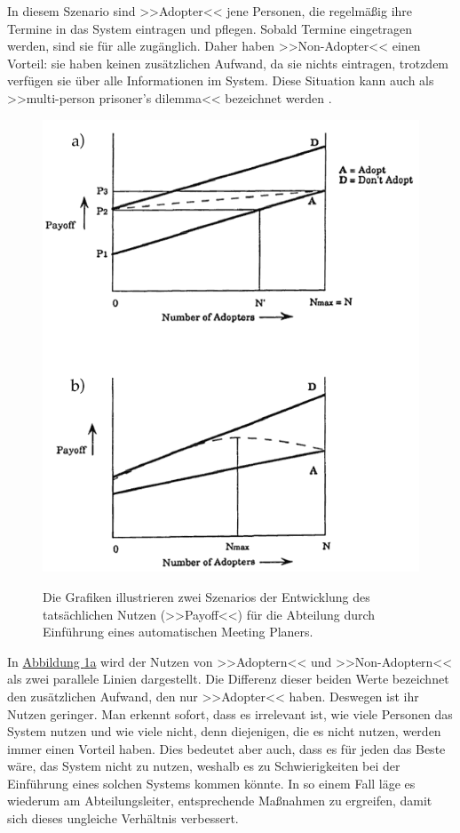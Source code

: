 	In diesem Szenario sind >>Adopter<< jene Personen, die regelmäßig ihre Termine in das System eintragen und pflegen. Sobald Termine eingetragen werden, sind sie für alle zugänglich. Daher haben >>Non-Adopter<< einen Vorteil: sie haben keinen zusätzlichen Aufwand, da sie nichts eintragen, trotzdem verfügen sie über alle Informationen im System. Diese Situation kann auch als >>multi-person prisoner's dilemma<< bezeichnet werden \citep{Schelling:1987}.

\begin{figure}
	{\includegraphics[width=1\linewidth]{gfx/markusMeetingPlanner}}
\caption[>>Payoff<< durch Nutzung eines automatischen Meeting Planers \newline \citep{Markus:1990}]{Die Grafiken illustrieren zwei Szenarios der Entwicklung des tatsächlichen Nutzen (>>Payoff<<) für die Abteilung durch Einführung eines automatischen Meeting Planers.}\label{fig:markusMeeting}
\end{figure}
\clearpage
In \hyperref[fig:markusMeeting]{Abbildung \ref*{fig:markusMeeting}a} wird der Nutzen von >>Adoptern<< und >>Non-Adoptern<< als zwei parallele Linien dargestellt. Die Differenz dieser beiden Werte bezeichnet den zusätzlichen Aufwand, den nur >>Adopter<< haben. Deswegen ist ihr Nutzen geringer. Man erkennt sofort, dass es irrelevant ist, wie viele Personen das System nutzen und wie viele nicht, denn diejenigen, die es nicht nutzen, werden immer einen Vorteil haben. Dies bedeutet aber auch, dass es für jeden das Beste wäre, das System nicht zu nutzen, weshalb es zu Schwierigkeiten bei der Einführung eines solchen Systems kommen könnte. In so einem Fall läge es wiederum am Abteilungsleiter, entsprechende Maßnahmen zu ergreifen, damit sich dieses ungleiche Verhältnis verbessert. 

